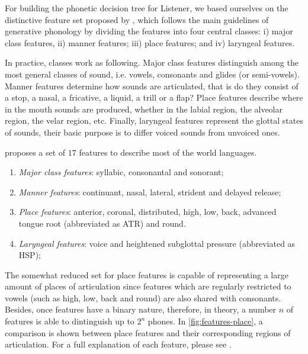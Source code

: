 For building the phonetic decision tree for Listener, we based ourselves on the distinctive feature set proposed by 
\citeauthor{Jensen2004} \citep{Jensen2004}, which follows the main guidelines of generative phonology by dividing
the features into four central classes: i) major class features, ii) manner features; iii) place features; and 
iv) laryngeal features.

In practice, classes work as following. Major class features distinguish among the most general classes of sound, 
i.e. vowels, consonants and glides (or semi-vowels). Manner features determine how sounds are articulated, 
that is do they consist of a stop, a nasal, a fricative, a liquid, a trill or a flap? Place features describe 
where in the mouth sounds are produced, whether in the labial region, the alveolar region, the velar region, etc.
Finally, laryngeal features represent the glottal states of sounds, their basic purpose is to differ voiced 
sounds from unvoiced ones.

\citeauthor{Jensen2004} \citep{Jensen2004} proposes a set of $17$ features to describe most of the world languages.

\begin{enumerate}
 \item \emph{Major class features}: syllabic, consonantal and sonorant;
 \item \emph{Manner features}: continuant, nasal, lateral, strident and delayed release;
 \item \emph{Place features}: anterior, coronal, distributed, high, low, back, advanced tongue root (abbreviated as \ac{ATR}) and round.
 \item \emph{Laryngeal features}: voice and heightened subglottal pressure (abbreviated as \ac{HSP});
\end{enumerate}

The somewhat reduced set for place features is capable of representing a large amount of places of articulation 
since features which are regularly restricted to vowels (such as high, low, back and round) are also shared 
with consonants. Besides, once features have a binary nature, therefore, in theory, a number $n$ of features is able
to dintinguish up to $2^n$ phones. In \autoref{fig:features-place}, a comparison is shown between place features and their corresponding
regions of articulation. For a full explanation of each feature, please see \citeauthor{Jensen2004} \citep{Jensen2004}.

